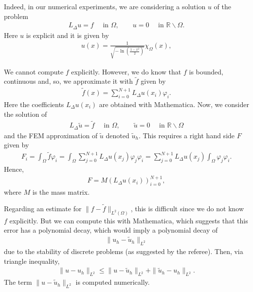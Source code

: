 \documentclass[11 pt]{article}
\numberwithin{equation}{section}
\def\r{\mathbb{R}}
\def\tilde{\widetilde}
\begin{document}
\begin{enumerate}
\begin{itemize}
Indeed, in our numerical experiments, we are considering a solution $u$ of the problem
        \begin{align*}
         L_\Delta u = f\quad \text{ in }\Omega,\qquad u=0\quad \text{ in }\r\backslash \Omega.
        \end{align*}
        Here $u$ is explicit and it is given by
        \begin{align}\label{udef}
 u(x)=\frac{1}{\sqrt{-\ln\left(\frac{1-x^2}{2}\right)}} \chi_{\Omega}(x),
\end{align}

We cannot compute $f$ explicitly.  However, we do know that $f$ is bounded, continuous and, so, we approximate it with $\widetilde f$ given by
\begin{align*}
 \widetilde f (x) = \sum_{i=0}^{N+1} L_\Delta u(x_i)\varphi_i.
 \end{align*}
Here the coefficients $L_\Delta u(x_i)$ are obtained with Mathematica. Now, we consider the solution of
\begin{align*}
         L_\Delta \widetilde u = \widetilde f\quad \text{ in }\Omega,\qquad \widetilde u=0\quad \text{ in }\r\backslash \Omega
        \end{align*}
and the FEM approximation of $\widetilde u$ denoted $\widetilde u_h$. This requires a right hand side $F$ given by
\begin{align*}
 F_i
 =\int_{\Omega} \widetilde f \varphi_i
 = \int_{\Omega} \sum_{j=0}^{N+1} L_\Delta u(x_j)\varphi_j \varphi_i
 =\sum_{j=0}^{N+1} L_\Delta u(x_j) \int_{\Omega} \varphi_j \varphi_i.
 \end{align*}
Hence,
\begin{align*}
 F = M  (L_\Delta u(x_i))_{i=0}^{N+1},
\end{align*}
where $M$ is the mass matrix.

Regarding an estimate for \(\|f-\tilde{f}\|_{L^{2}(\Omega)}\), this is difficult since we do not know $f$ explicitly. But we can compute this with Mathematica, which suggests that this error has a polynomial decay, which would imply a polynomial decay of
\begin{align*}
\|u_{h}-\widetilde u_{h}\|_{L^2}
\end{align*}
due to the stability of discrete problems (as suggested by the referee).  Then, via triangle inequality,
\begin{align*}
 \|u-u_h\|_{L^2}
 \leq \|u-\widetilde u_h\|_{L^2}+\|\widetilde u_h-u_h\|_{L^2}.
\end{align*}
The term $\|u-\widetilde u_h\|_{L^2}$ is computed numerically.


\end{itemize}
\end{enumerate}
\end{document}
